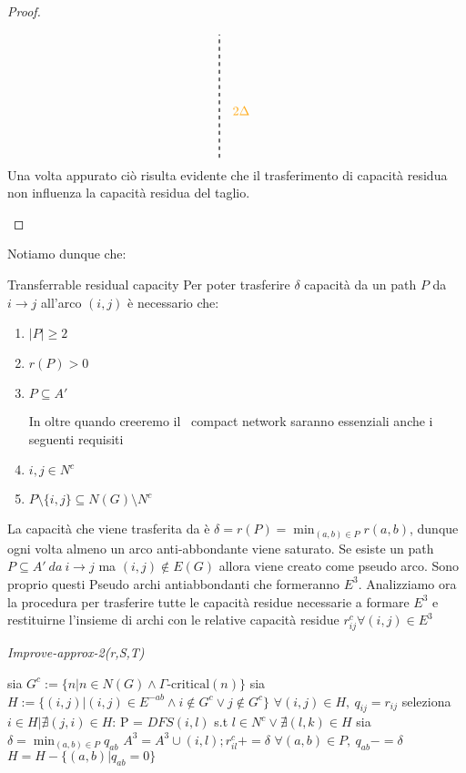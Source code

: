 \begin{proof}
\begin{enumerate}
\[\begin{tikzpicture}[node distance={15mm}, thick , main/.style = {draw, circle}]
                        \draw[dashed] (1.8,-1.7) -- (1.8,1.7);
                        \node at (2.4, -.4) {\text{\color{darktangerine}{$2\Delta$}}};
                    \end{tikzpicture}\]
                Una volta appurato ciò risulta evidente che il trasferimento di capacità residua non influenza la capacità residua del taglio. \QED
            \end{enumerate}
        \end{proof}
    Notiamo dunque che:
    \begin{definition}
        {Transferrable residual capacity}{}
        Per poter trasferire $\delta$ capacità da un path $P$ da $i\rightarrow j$ all'arco $(i,j)$ è necessario che:
        \begin{enumerate}
            \item $|P|\ge 2$
            \item $r(P) > 0$
            \item $P\subseteq A'$
       
        In oltre quando creeremo il \gmm\ compact network saranno essenziali anche i seguenti requisiti
        \item $i,j \in N^c$
        \item $P\setminus \{i,j\} \subseteq N(G) \setminus N^c$
    \end{enumerate}
    \end{definition} 
    La capacità che viene trasferita da è $\delta = r(P) = \min_{(a,b)\in P} r(a,b)$, dunque ogni volta almeno un arco anti-abbondante viene saturato. 
    Se esiste un path $P\subseteq A'\ da\ i\rightarrow j $ ma $(i,j)\not \in E(G)$ allora viene creato come pseudo arco. 
    Sono proprio questi Pseudo archi antiabbondanti che formeranno $E^3$. 
    Analizziamo ora la procedura per trasferire tutte le capacità residue necessarie a formare $E^3$ e restituirne l'insieme di archi
    con le relative capacità residue $r^c_{ij} \forall (i,j)\in E^3$

\begin{algorithm}
    \caption{\textit{Improve-approx-2(r,S,T)}}
    \label{algotrans}
    \begin{algorithmic}[1]
        \State sia $G^c := \{n | n\in N(G)\land \Gamma\text{-critical}(n)\}$
        \State sia $H := \{(i,j)| (i,j)\in E^{-ab}\land i \not \in G^c \lor j \not \in G^c\}$
        \State $\forall (i,j)\in H,\ q_{ij} = r_{ij}$
            \State seleziona $i \in H | \nexists (j,i) \in H$:
            \State P = $DFS(i, l)$ s.t $l\in N^c \lor \nexists (l,k)\in H$ 
            \State sia $\delta = \min_{(a,b)\in P}q_{ab}$
                \State $A^3 = A^3 \cup {(i,l)}; r^c_{il} += \delta$
            \EndIf
            \State $\forall (a,b) \in P,\ q_{ab} -= \delta$
            \State $H = H- \{(a,b) | q_{ab} = 0\}$ 
        \EndWhile 
    \end{algorithmic}
\end{algorithm}

